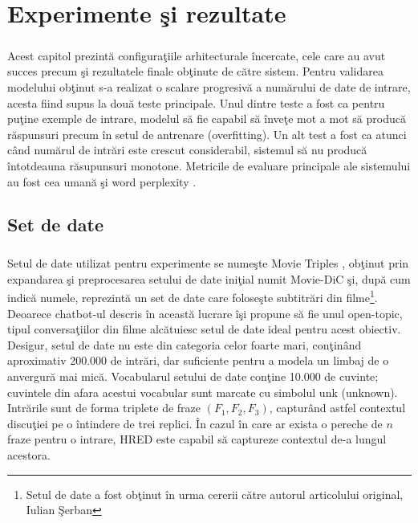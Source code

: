 \chapter{Experimente \c si rezultate}

\paragraph{}
Acest capitol prezint\u a configura\c tiile arhitecturale \^ incercate, cele care au avut succes precum \c si rezultatele finale ob\c tinute de c\u atre sistem. Pentru validarea modelului ob\c tinut s-a realizat o scalare progresiv\u a a num\u arului de date de intrare, acesta fiind supus la dou\u a teste principale. Unul dintre teste a fost ca pentru pu\c tine exemple de intrare, modelul s\u a fie capabil s\u a \^ inve\c te mot a mot s\u a produc\u a r\u aspunsuri precum \^ in setul de antrenare (overfitting). Un alt test a fost ca atunci c\^ and num\u arul de intr\u ari este crescut considerabil, sistemul s\u a nu produc\u a \^ intotdeauna r\u asupunsuri monotone. Metricile de evaluare principale ale sistemului au fost cea uman\u a \c si word perplexity \cite{Bengio:2003:NPL:944919.944966}.

\section{Set de date}

\paragraph{}
Setul de date utilizat pentru experimente se nume\c ste Movie Triples \cite{DBLP:journals/corr/SerbanSBCP15}, ob\c tinut prin expandarea \c si preprocesarea setului de date ini\c tial numit Movie-DiC \cite{Banchs:2012:MMD:2390665.2390716} \c si, dup\u a cum indic\u a numele, reprezint\u a un set de date care folose\c ste subtitr\u ari din filme\footnote{Setul de date a fost ob\c tinut \^ in urma cererii c\u atre autorul articolului original, Iulian \c Serban}. Deoarece chatbot-ul descris \^ in aceast\u a lucrare \^ i\c si propune s\u a fie unul open-topic, tipul conversa\c tiilor din filme alc\u atuiesc setul de date ideal pentru acest obiectiv. Desigur, setul de date nu este din categoria celor foarte mari, con\c tin\^ and aproximativ 200.000 de intr\u ari, dar suficiente pentru a modela un limbaj de o anvergur\u a mai mic\u a. Vocabularul setului de date con\c tine 10.000 de cuvinte; cuvintele din afara acestui vocabular sunt marcate cu simbolul unk (unknown). Intr\u arile sunt de forma triplete de fraze \((F_1, F_2, F_3)\), captur\^ and astfel contextul discu\c tiei pe o \^ intindere de trei replici. \^ In cazul \^ in care ar exista o pereche de \(n\) fraze pentru o intrare, HRED este capabil s\u a captureze contextul de-a lungul acestora.

